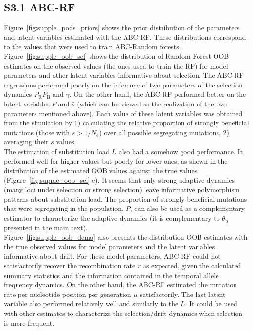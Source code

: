 \documentclass[a4paper, 12pt]{article}
\begin{document}
\subsection*{S3.1 ABC-RF}

Figure~\ref{fig:supple_pods_priors} shows the prior distribution of the parameters and latent variables estimated with the ABC-RF. These distributions correspond to the values that were used to train ABC-Random forests.\\

Figure~\ref{fig:supple_oob_sel} shows the distribution of Random Forest OOB estimates on the observed values (the ones used to train the RF) for model parameters and other latent variables informative about selection. The ABC-RF regressions performed poorly on the inference of two parameters of the selection dynamics $P_{\mathrm{R}}P_{\mathrm{B}}$ and $\gamma$. On the other hand, the ABC-RF performed better on the latent variables $P$ and $\bar{s}$ (which can be viewed as the realization of the two parameters mentioned above). Each value of these latent variables was obtained from the simulation by 1) calculating the relative proportion of strongly beneficial mutations (those with $s > 1/N_{\mathrm{e}}$) over all possible segregating mutations, 2) averaging their $s$ values.\\

The estimation of substitution load $L$ also had a somehow good performance. It performed well for higher values but poorly for lower ones, as shown in the distribution of the estimated OOB values against the true values (Figure~\ref{fig:supple_oob_sel} e). It seems that only strong adaptive dynamics (many loci under selection or strong selection) leave informative polymorphism patterns about substitution load. The proportion of strongly beneficial mutations that were segregating in the population, $P$, can also be used as a complementary estimator to characterize the adaptive dynamics (it is complementary to $\theta_{\mathrm{b}}$ presented in the main text).\\

Figure~\ref{fig:supple_oob_demo} also presents the distribution OOB estimates with the true observed values for model parameters and the latent variables informative about drift. For these model parameters, ABC-RF could not satisfactorily recover the recombination rate $r$ as expected, given the calculated summary statistics and the information contained in the temporal allele frequency dynamics. On the other hand, the ABC-RF estimated the mutation rate per nucleotide position per generation $\mu$ satisfactorily. The last latent variable also performed relatively well and similarly to the $L$. It could be used with other estimates to characterize the selection/drift dynamics when selection is more frequent.\\
\end{document}
